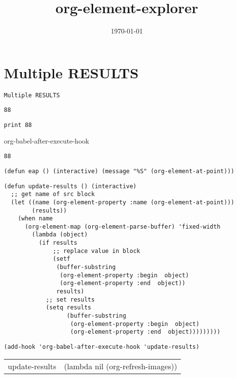 \documentclass[aps,prb,citeautoscript,preprint,citeautoscript,showkeys]{revtex4-1}
\date{\today}
\title{org-element-explorer}
\begin{document}
\section{Multiple RESULTS}
\label{sec-1}

\texttt{Multiple RESULTS}

\begin{verbatim}
88
\end{verbatim}


\begin{verbatim}
print 88
\end{verbatim}


org-babel-after-execute-hook




\begin{verbatim}
88
\end{verbatim}


\begin{verbatim}
(defun eap () (interactive) (message "%S" (org-element-at-point)))
\end{verbatim}

\begin{verbatim}
(defun update-results () (interactive)
  ;; get name of src block
  (let ((name (org-element-property :name (org-element-at-point)))
        (results))
    (when name
      (org-element-map (org-element-parse-buffer) 'fixed-width
        (lambda (object)
          (if results
              ;; replace value in block
              (setf
               (buffer-substring
                (org-element-property :begin  object)
                (org-element-property :end  object))
               results)
            ;; set results
            (setq results
                  (buffer-substring
                   (org-element-property :begin  object)
                   (org-element-property :end  object)))))))))
\end{verbatim}


\begin{verbatim}
(add-hook 'org-babel-after-execute-hook 'update-results)
\end{verbatim}
\begin{center}
\begin{tabular}{ll}
update-results & (lambda nil (org-refresh-images))\\
\end{tabular}
\end{center}
\end{document}
